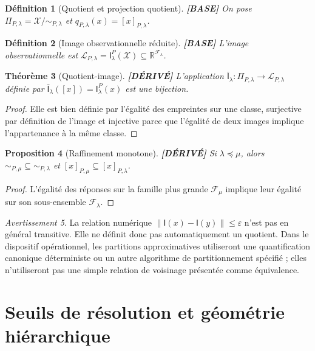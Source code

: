 \documentclass[11pt,a4paper]{article}
\newtheorem{definition}{Définition}[section]
\newtheorem{proposition}[definition]{Proposition}
\newtheorem{theorem}[definition]{Théorème}
\theoremstyle{remark}
\newtheorem{warning}[definition]{Avertissement}
\newcommand{\R}{\mathbb R}
\newcommand{\X}{\mathcal X}
\newcommand{\F}{\mathcal F}
\newcommand{\Emp}{\mathsf I}
\begin{document}
\begin{definition}[Quotient et projection quotient] \textbf{[BASE]}
On pose $\Pi_{P,\lambda}=\X/{\sim_{P,\lambda}}$ et $q_{P,\lambda}(x)=[x]_{P,\lambda}$.
\end{definition}

\begin{definition}[Image observationnelle réduite] \textbf{[BASE]}
L'image observationnelle est $\mathcal L_{P,\lambda}=\Emp_\lambda^P(\X)\subseteq\R^{\F_\lambda}$.
\end{definition}

\begin{theorem}[Quotient-image] \textbf{[DÉRIVÉ]}
L'application $\bar{\Emp}_\lambda:\Pi_{P,\lambda}\to\mathcal L_{P,\lambda}$ définie par $\bar{\Emp}_\lambda([x])=\Emp_\lambda^P(x)$ est une bijection.
\end{theorem}
\begin{proof}
Elle est bien définie par l'égalité des empreintes sur une classe, surjective par définition de l'image et injective parce que l'égalité de deux images implique l'appartenance à la même classe.
\end{proof}

\begin{proposition}[Raffinement monotone] \textbf{[DÉRIVÉ]}
Si $\lambda\preceq\mu$, alors $\sim_{P,\mu}\subseteq\sim_{P,\lambda}$ et $[x]_{P,\mu}\subseteq[x]_{P,\lambda}$.
\end{proposition}
\begin{proof}
L'égalité des réponses sur la famille plus grande $\F_\mu$ implique leur égalité sur son sous-ensemble $\F_\lambda$.
\end{proof}

\begin{warning}
La relation numérique $\|\Emp(x)-\Emp(y)\|\leq\varepsilon$ n'est pas en général transitive. Elle ne définit donc pas automatiquement un quotient. Dans le dispositif opérationnel, les partitions approximatives utiliseront une quantification canonique déterministe ou un autre algorithme de partitionnement spécifié ; elles n'utiliseront pas une simple relation de voisinage présentée comme équivalence.
\end{warning}

\section{Seuils de résolution et géométrie hiérarchique}
\end{document}
